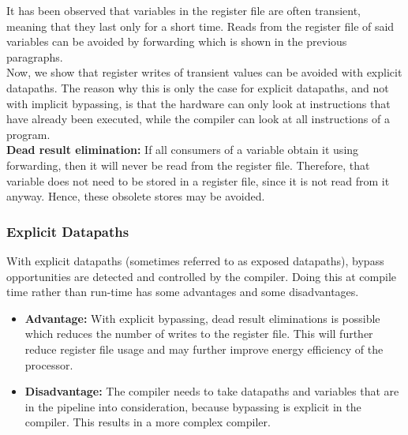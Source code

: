 It has been observed that variables in the register file are often transient, meaning that they last only for a short time.  Reads from the register file of said variables can be avoided by forwarding which is shown in the previous paragraphs.\\

Now, we show that register writes of transient values can be avoided with explicit datapaths. The reason why this is only the case for explicit datapaths, and not with implicit bypassing, is that the hardware can only look at instructions that have already been executed, while the compiler can look at all instructions of a program.\\

\textbf{Dead result elimination:} 
If all consumers of a variable obtain it using forwarding, then it will never be read from the register file. Therefore, that variable does not need to be stored in a register file, since it is not read from it anyway. Hence, these obsolete stores may be avoided.  

\subsubsection{Explicit Datapaths}
With explicit datapaths (sometimes referred to as exposed datapaths), bypass opportunities are detected and controlled by the compiler. Doing this at compile time rather than run-time has some advantages and some disadvantages.
\begin{itemize}
  \item\textbf{Advantage:}
    With explicit bypassing, dead result eliminations is possible which reduces the number of writes to the register file. This will further reduce register file usage and may further improve energy efficiency of the processor.
  \item\textbf{Disadvantage:}
    The compiler needs to take datapaths and variables that are in the pipeline into consideration, because bypassing is explicit in the compiler. This results in a more complex compiler.
\end{itemize}

